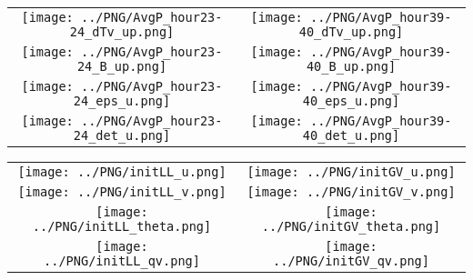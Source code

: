 \documentclass{article}
\begin{document}
\newpage

\begin{table}
  \begin{tabular}{cc}
     \texttt{[image: ../PNG/AvgP\_hour23-24\_dTv\_up.png]} & \texttt{[image: ../PNG/AvgP\_hour39-40\_dTv\_up.png]} \\
     \texttt{[image: ../PNG/AvgP\_hour23-24\_B\_up.png]}   & \texttt{[image: ../PNG/AvgP\_hour39-40\_B\_up.png]}   \\
     \texttt{[image: ../PNG/AvgP\_hour23-24\_eps\_u.png]}  & \texttt{[image: ../PNG/AvgP\_hour39-40\_eps\_u.png]}  \\
     \texttt{[image: ../PNG/AvgP\_hour23-24\_det\_u.png]}  & \texttt{[image: ../PNG/AvgP\_hour39-40\_det\_u.png]}
  \end{tabular}
\end{table}

\newpage

\begin{table}
  \begin{tabular}{cc}
     \texttt{[image: ../PNG/initLL\_u.png]}     & \texttt{[image: ../PNG/initGV\_u.png]}     \\
     \texttt{[image: ../PNG/initLL\_v.png]}     & \texttt{[image: ../PNG/initGV\_v.png]}     \\
     \texttt{[image: ../PNG/initLL\_theta.png]} & \texttt{[image: ../PNG/initGV\_theta.png]} \\
     \texttt{[image: ../PNG/initLL\_qv.png]}    & \texttt{[image: ../PNG/initGV\_qv.png]}
  \end{tabular}
\end{table}
\end{document}
